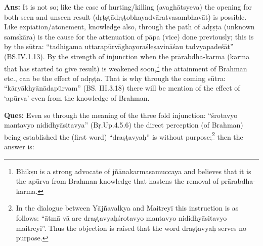 \textbf{Ans:} It is not so; like the case of hurting/killing (avaghātsyeva) the opening for both seen and unseen result (dṛṭṣṭādṛṣṭobhayadvāratva\-sambhavāt) is  possible. Like expiation/atonement, knowledge also, through the path of adṛṣṭa (unknown samskāra) is the cause for the attenuation of pāpa (vice) done previously; this is by the sūtra: “tadhigama uttarapūrvāghayoraśleṣavināśau tadvyapadeśāt” (BS.IV.1.13). By the strength of injunction when the prārabdha-karma (karma that has started to give result) is weakened soon,\footnote{Bhikṣu is a strong advocate of jñānakarmasamuccaya and believes that it is the apūrva from Brahman knowledge that hastens the removal of prārabdha-karma.} the attainment of Brahman etc., can be the effect of adṛṣṭa. That is why through the coming sūtra: “kāryākhyānādapūrvam” (BS. III.3.18) there will be mention of the effect of ‘apūrva’ even from the knowledge of Brahman.

\textbf{Ques:} Even so through the meaning of the three fold injunction: “śrotavyo mantavyo nididhyāsitavya” (Bṛ.Up.4.5.6) the direct perception (of Brahman) being established  the (first word) “draṣṭavyaḥ” is without purpose;\footnote{In the dialogue between Yājñavalkya and Maitreyī this instruction is as follows: “ātmā vā are draṣṭavyaḥśrotavyo mantavyo nididhyāsitavyo maitreyi”. Thus the objection is raised that the word draṣṭavyaḥ serves no purpose.} then the answer is:

